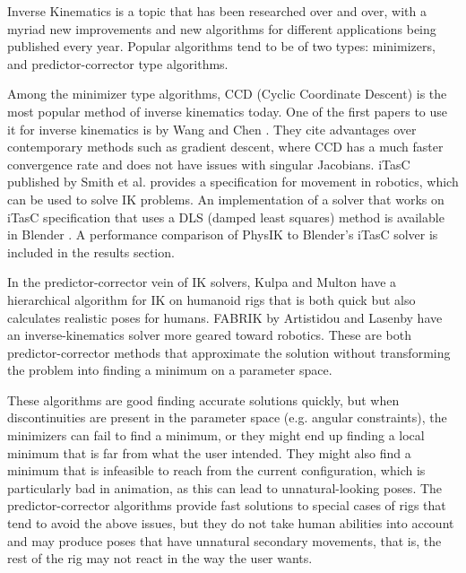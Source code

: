 \documentclass[10pt,twocolumn,letterpaper]{article}
\begin{document}
Inverse Kinematics is a topic that has been researched over and over, with a myriad new improvements and new algorithms for different applications being published every year. Popular algorithms tend to be of two types: minimizers, and predictor-corrector type algorithms.

Among the minimizer type algorithms, CCD (Cyclic Coordinate Descent) is the most popular method of inverse kinematics today. One of the first papers to use it for inverse kinematics is by Wang and Chen \cite{Wa}. They cite advantages over contemporary methods such as gradient descent, where CCD has a much faster convergence rate and does not have issues with singular Jacobians. iTasC published by Smith et al. \cite{Sm} provides a specification for movement in robotics, which can be used to solve IK problems. An implementation of a solver that works on iTasC specification that uses a DLS (damped least squares) method is available in Blender \cite{Bl}. A performance comparison of PhysIK to Blender's iTasC solver is included in the results section. 

In the predictor-corrector vein of IK solvers, Kulpa and Multon \cite{Ku} have a hierarchical algorithm for IK on humanoid rigs that is both quick but also calculates realistic poses for humans. FABRIK by Artistidou and Lasenby \cite{Ar} have an inverse-kinematics solver more geared toward robotics. These are both predictor-corrector methods that approximate the solution without transforming the problem into finding a minimum on a parameter space. 

These algorithms are good finding accurate solutions quickly, but when discontinuities are present in the parameter space (e.g. angular constraints), the minimizers can fail to find a minimum, or they might end up finding a local minimum that is far from what the user intended. They might also find a minimum that is infeasible to reach from the current configuration, which is particularly bad in animation, as this can lead to unnatural-looking poses. The predictor-corrector algorithms provide fast solutions to special cases of rigs that tend to avoid the above issues, but they do not take human abilities into account and may produce poses that have unnatural secondary movements, that is, the rest of the rig may not react in the way the user wants. 
\end{document}
